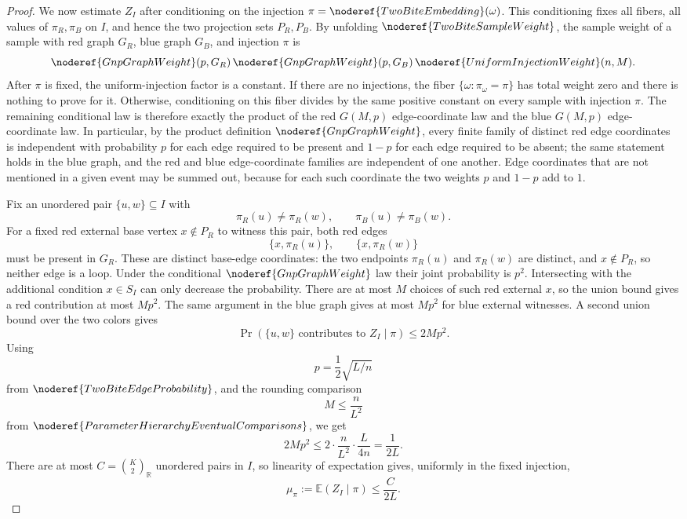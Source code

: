 \begin{proof}
We now estimate \(Z_I\) after conditioning on the injection
\(\pi=\noderef{TwoBiteEmbedding}(\omega)\).  This conditioning fixes all
fibers, all values of \(\pi_R,\pi_B\) on \(I\), and hence the two projection
sets \(P_R,P_B\).  By unfolding \(\noderef{TwoBiteSampleWeight}\), the sample
weight of a sample with red graph \(G_R\), blue graph \(G_B\), and injection
\(\pi\) is
\[
\noderef{GnpGraphWeight}(p,G_R)\,
\noderef{GnpGraphWeight}(p,G_B)\,
\noderef{UniformInjectionWeight}(n,M).
\]
After \(\pi\) is fixed, the uniform-injection factor is a constant.  If there
are no injections, the fiber \(\{\omega:\pi_\omega=\pi\}\) has total weight
zero and there is nothing to prove for it.  Otherwise, conditioning on this
fiber divides by the same positive constant on every sample with injection
\(\pi\).  The remaining conditional law is therefore exactly the product of
the red \(G(M,p)\) edge-coordinate law and the blue \(G(M,p)\)
edge-coordinate law.  In particular, by the product definition
\(\noderef{GnpGraphWeight}\), every finite family of distinct red edge
coordinates is independent with probability \(p\) for each edge required to be
present and \(1-p\) for each edge required to be absent; the same statement
holds in the blue graph, and the red and blue edge-coordinate families are
independent of one another.  Edge coordinates that are not mentioned in a
given event may be summed out, because for each such coordinate the two
weights \(p\) and \(1-p\) add to \(1\).

Fix an unordered pair \(\{u,w\}\subseteq I\) with
\[
\pi_R(u)\ne\pi_R(w),\qquad \pi_B(u)\ne\pi_B(w).
\]
For a fixed red external base vertex \(x\notin P_R\) to witness this pair,
both red
edges
\[
\{x,\pi_R(u)\},\qquad \{x,\pi_R(w)\}
\]
must be present in \(G_R\).  These are distinct base-edge coordinates: the two
endpoints \(\pi_R(u)\) and \(\pi_R(w)\) are distinct, and \(x\notin P_R\), so
neither edge is a loop.  Under the conditional \(\noderef{GnpGraphWeight}\)
law their joint probability is \(p^2\).  Intersecting with the additional
condition \(x\in S_I\) can only decrease the probability.  There are at most
\(M\) choices of such red external \(x\), so the union bound gives a red
contribution at most \(Mp^2\).  The same argument in the blue graph gives at
most \(Mp^2\) for blue external witnesses.  A second union bound over the two
colors gives
\[
\Pr(\{u,w\}\text{ contributes to }Z_I\mid\pi)\le2Mp^2. \tag{6}
\]
Using
\[
p=\frac12\sqrt{L/n}
\]
from \(\noderef{TwoBiteEdgeProbability}\), and the rounding comparison
\[
M\le\frac{n}{L^2}
\]
from \(\noderef{ParameterHierarchyEventualComparisons}\), we get
\[
2Mp^2\le 2\cdot\frac{n}{L^2}\cdot\frac{L}{4n}
=\frac1{2L}. \tag{7}
\]
There are at most \(C=\binom{K}{2}_{\mathbb R}\) unordered pairs in \(I\), so
linearity of expectation gives, uniformly in the fixed injection,
\[
\mu_\pi:=\mathbb E(Z_I\mid\pi)\le\frac{C}{2L}. \tag{8}
\]


\end{proof}
